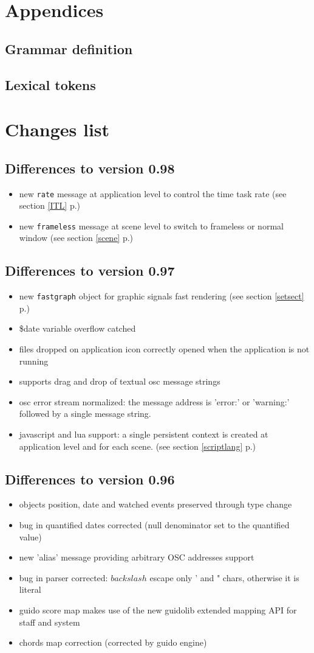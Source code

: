 \documentclass[a4paper,twoside]{report}
\newcommand{\toplevel}[1]	{\chapter{#1}}
\newcommand{\sublevel}[1]	{\section{#1}}
\newcommand{\fullref}[1]	{\ref{#1} p.\pageref{#1}}
\newcommand{\OSC}[1]		{\texttt{#1}}
\begin{document}
\toplevel{Appendices}
\sublevel{Grammar definition}


\sublevel{Lexical tokens}



\toplevel{ Changes list}


\sublevel{Differences to version 0.98}
\begin{itemize}
\item new \OSC{rate} message at application level to control the time task rate (see section \fullref{ITL})
\item new \OSC{frameless} message at scene level to switch to frameless or normal window (see section \fullref{scene})
\end{itemize}

\sublevel{Differences to version 0.97}
\begin{itemize}
\item new \OSC{fastgraph} object for graphic signals fast rendering (see section \fullref{setsect})
\item \$date variable overflow catched
\item files dropped on application icon correctly opened when the application is not running
\item supports drag and drop of textual osc message strings
\item osc error stream normalized: the message address is 'error:' or 'warning:'
   followed by a single message string.
\item javascript and lua support: a single persistent context is created at application level and for each scene. 
(see section \fullref{scriptlang})
\end{itemize}

\sublevel{Differences to version 0.96}
\begin{itemize}
\item  objects position, date and watched events preserved through type change
\item  bug in quantified dates corrected (null denominator set to the quantified value)
\item  new 'alias' message providing arbitrary OSC addresses support
\item  bug in parser corrected: $backslash$ escape only ' and " chars, otherwise it is literal
\item  guido score map makes use of the new guidolib extended mapping API for staff and system
\item  chords map correction (corrected by guido engine) 
\end{itemize}
\end{document}
